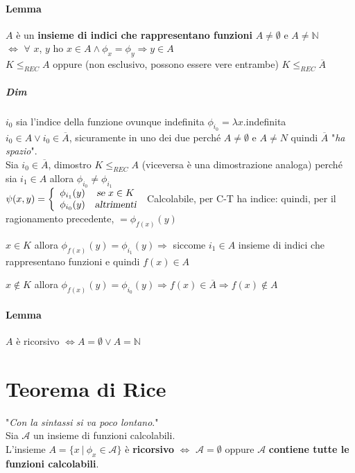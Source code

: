 \documentclass[10pt]{book}
\begin{document}
\paragraph{Lemma} $A$ è un \textbf{insieme di indici che rappresentano funzioni} $A \neq \emptyset$ e $A \neq \mathbb{N}$\\$\Leftrightarrow$ $\forall$ $x$, $y$ ho $x \in A \wedge \phi_x = \phi_y \Rightarrow y \in A$ \\
$K \leq_{REC} A$ oppure (non esclusivo, possono essere vere entrambe) $K \leq_{REC} \overline{A}$
\subparagraph{Dim} $i_0$ sia l'indice della funzione ovunque indefinita $\phi_{i_0} = \lambda x.$indefinita\\
$i_0 \in A \vee i_0 \in \overline{A}$, sicuramente in uno dei due perché $A \neq \emptyset$ e $A \neq N$ quindi $\overline{A}$ "\textit{ha spazio}".\\
Sia $i_0 \in \overline{A}$, dimostro $K \leq_{REC} A$ (viceversa è una dimostrazione analoga) perché sia $i_1 \in A$ allora $\phi_{i_0} \neq \phi_{i_1}$\\
$\psi(x, y) = \left\{
\begin{array}{l c}
\phi_{i_1}(y) & \textsl{se }x \in K\\
\phi_{i_0}(y) & \textsl{altrimenti}
\end{array}\right.$
Calcolabile, per C-T ha indice: quindi, per il ragionamento precedente, $= \phi_{f(x)}(y)$
\begin{list}{}{}
	\item $x \in K$ allora $\phi_{f(x)}(y)  = \phi_{i_1}(y) \Rightarrow$ siccome $i_1 \in A$ insieme di indici che rappresentano funzioni e quindi $f(x) \in A$
	\item $x \not\in K$ allora $\phi_{f(x)}(y)  = \phi_{i_0}(y) \Rightarrow f(x) \in \overline{A} \Rightarrow f(x) \not\in A$
\end{list}
\paragraph{Lemma} $A$ è ricorsivo $\Leftrightarrow A = \emptyset \vee A = \mathbb{N}$

\section{Teorema di Rice}
"\textit{Con la sintassi si va poco lontano}."\\ %
Sia $\mathscr{A}$ un insieme di funzioni calcolabili.\\
L'insieme $A = \{x \:|\: \phi_x \in \mathscr{A}\}$ è \textbf{ricorsivo} $\Leftrightarrow$ $\mathscr{A} = \emptyset$ oppure $\mathscr{A}$ \textbf{contiene tutte le funzioni calcolabili}.
\end{document}
